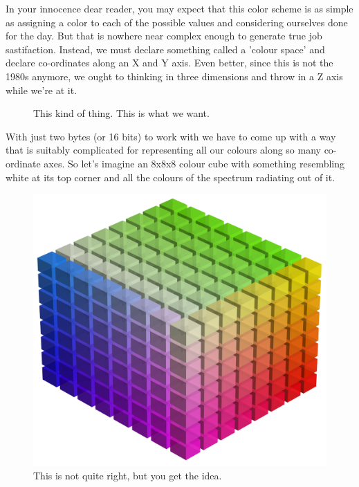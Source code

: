 In your innocence dear reader, you may expect that this color scheme is as simple as assigning a color to each of the possible values
and considering ourselves done for the day. But that is nowhere near complex enough to generate true job sastifaction. Instead, we must
declare something called a 'colour space' and declare co-ordinates along an X and Y axis. Even better, since this is not the 1980s
anymore, we ought to thinking in three dimensions and throw in a Z axis while we're at it.

\begin{figure}[H]
    \centering
    \begin{adjustbox}{width=7cm,center}
    \end{adjustbox}
\caption{This kind of thing. This is what we want.}
\end{figure}

With just two bytes (or 16 bits) to work with we have to come up with a way that is suitably complicated for representing all our colours 
along so many co-ordinate axes. So let's imagine an 8x8x8 colour cube with something resembling white at its top corner and all the colours of
the spectrum radiating out of it.

\begin{figure}[H]
    \centering
    \begin{adjustbox}{width=7cm,center}
      \includegraphics[width=12cm]{src/cry/cube.png}%
    \end{adjustbox}
\caption{This is not quite right, but you get the idea.}
\end{figure}

